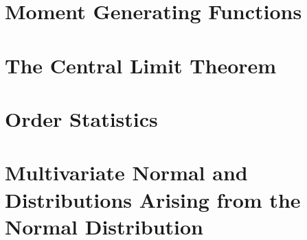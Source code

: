 \documentclass[../../../main.tex]{subfiles}
\begin{document}
\section{Moment Generating Functions}
\section{The Central Limit Theorem}
\section{Order Statistics}
\section{Multivariate Normal and Distributions Arising from the Normal Distribution}

\printbibliography[
    heading=subbibintoc,
    title={References}
]
\end{document}
